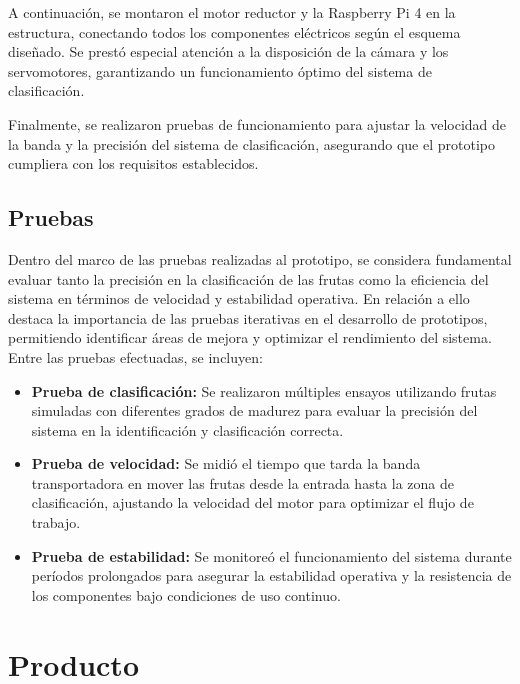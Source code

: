 A continuación, se montaron el motor reductor y la Raspberry Pi 4 en la estructura, conectando todos los componentes eléctricos según el esquema diseñado. Se prestó especial atención a la disposición de la cámara y los servomotores, garantizando un funcionamiento óptimo del sistema de clasificación.

Finalmente, se realizaron pruebas de funcionamiento para ajustar la velocidad de la banda y la precisión del sistema de clasificación, asegurando que el prototipo cumpliera con los requisitos establecidos.

\subsection{Pruebas}

Dentro del marco de las pruebas realizadas al prototipo, se considera fundamental evaluar tanto la precisión en la clasificación de las frutas como la eficiencia del sistema en términos de velocidad y estabilidad operativa. En relación a ello \cite{Dym2013} destaca la importancia de las pruebas iterativas en el desarrollo de prototipos, permitiendo identificar áreas de mejora y optimizar el rendimiento del sistema. Entre las pruebas efectuadas, se incluyen:
\begin{itemize}
    \item \textbf{Prueba de clasificación:} Se realizaron múltiples ensayos utilizando frutas simuladas con diferentes grados de madurez para evaluar la precisión del sistema en la identificación y clasificación correcta.
    \item \textbf{Prueba de velocidad:} Se midió el tiempo que tarda la banda transportadora en mover las frutas desde la entrada hasta la zona de clasificación, ajustando la velocidad del motor para optimizar el flujo de trabajo.
    \item \textbf{Prueba de estabilidad:} Se monitoreó el funcionamiento del sistema durante períodos prolongados para asegurar la estabilidad operativa y la resistencia de los componentes bajo condiciones de uso continuo.
\end{itemize}

\newpage

\section{Producto}

